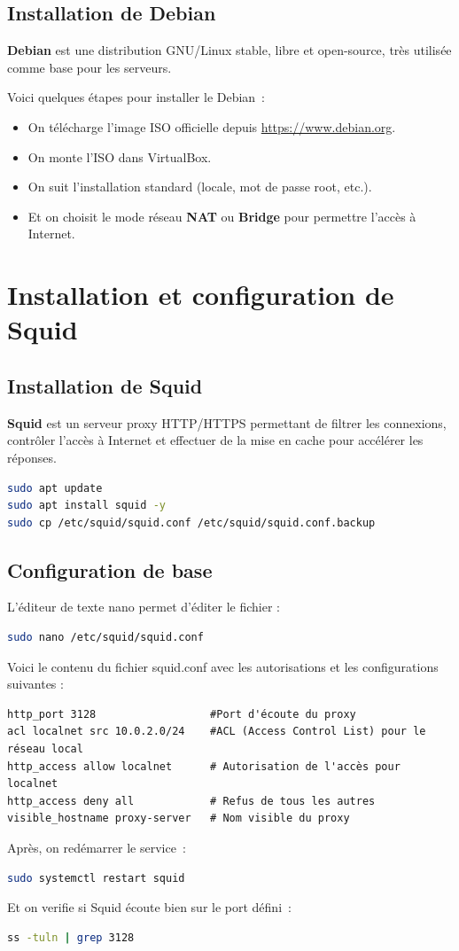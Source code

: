 \documentclass[12pt,a4paper]{article}
\begin{document}
\subsection{Installation de Debian}
\textbf{Debian} est une distribution GNU/Linux stable, libre et open-source, très utilisée comme base pour les serveurs. 

Voici quelques étapes pour installer le Debian :

\begin{itemize}
    \item On télécharge l'image ISO officielle depuis \href{https://www.debian.org/}{https://www.debian.org}.
    \item On monte l'ISO dans VirtualBox.
    \item On suit l'installation standard (locale, mot de passe root, etc.).
    \item Et on choisit le mode réseau \textbf{NAT} ou \textbf{Bridge} pour permettre l'accès à Internet.
\end{itemize}


\section{Installation et configuration de Squid}
\subsection{Installation de Squid}
\textbf{Squid} est un serveur proxy HTTP/HTTPS permettant de filtrer les connexions, contrôler l'accès à Internet et effectuer de la mise en cache pour accélérer les réponses.
\begin{lstlisting}[language=bash]
sudo apt update
sudo apt install squid -y
sudo cp /etc/squid/squid.conf /etc/squid/squid.conf.backup
\end{lstlisting}
\subsection{\textbf{Configuration de base} }
L'éditeur de texte nano permet d'éditer le fichier :
\begin{lstlisting}[language=bash]
sudo nano /etc/squid/squid.conf
\end{lstlisting}
Voici le contenu du fichier squid.conf avec les autorisations et les configurations suivantes :
\begin{lstlisting}
http_port 3128                  #Port d'écoute du proxy
acl localnet src 10.0.2.0/24    #ACL (Access Control List) pour le réseau local
http_access allow localnet      # Autorisation de l'accès pour localnet 
http_access deny all            # Refus de tous les autres
visible_hostname proxy-server   # Nom visible du proxy 
\end{lstlisting}
Après, on redémarrer le service :
\begin{lstlisting}[language=bash]
sudo systemctl restart squid
\end{lstlisting}
Et on verifie si Squid écoute bien sur le port défini :
\begin{lstlisting}[language=bash]
ss -tuln | grep 3128
\end{lstlisting}
\end{document}

